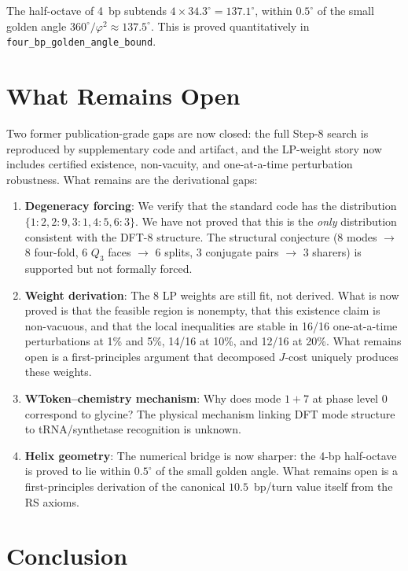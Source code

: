 \documentclass[11pt,twocolumn]{article}
\newcommand{\vp}{\varphi}
\newcommand{\lean}[1]{\texttt{#1}}
\begin{document}
The half-octave of 4~bp subtends $4 \times 34.3^\circ = 137.1^\circ$, within
$0.5^\circ$ of the small golden angle $360^\circ/\vp^2 \approx 137.5^\circ$. This is
proved quantitatively in \lean{four\_bp\_golden\_angle\_bound}.

\section{What Remains Open}

Two former publication-grade gaps are now closed: the full Step-8 search is
reproduced by supplementary code and artifact, and the LP-weight story now
includes certified existence, non-vacuity, and one-at-a-time perturbation
robustness. What remains are the derivational gaps:

\begin{enumerate}
\item \textbf{Degeneracy forcing}: We verify that the standard code has
  the distribution $\{1{:}2, 2{:}9, 3{:}1, 4{:}5, 6{:}3\}$. We have
  not proved that this is the \emph{only} distribution consistent with
  the DFT-8 structure. The structural conjecture (8 modes $\to$ 8
  four-fold, 6 $Q_3$ faces $\to$ 6 splits, 3 conjugate pairs $\to$ 3
  sharers) is supported but not formally forced.

\item \textbf{Weight derivation}: The 8 LP weights are still fit, not
  derived. What is now proved is that the feasible region is nonempty,
  that this existence claim is non-vacuous, and that the local
  inequalities are stable in 16/16 one-at-a-time perturbations at 1\%
  and 5\%, 14/16 at 10\%, and 12/16 at 20\%. What remains open is a
  first-principles argument that
  decomposed $J$-cost uniquely produces these weights.

\item \textbf{WToken--chemistry mechanism}: Why does mode $1{+}7$ at
  phase level 0 correspond to glycine? The physical mechanism linking
  DFT mode structure to tRNA/synthetase recognition is unknown.

\item \textbf{Helix geometry}: The numerical bridge is now sharper: the
  4-bp half-octave is proved to lie within $0.5^\circ$ of the small golden
  angle. What remains open is a first-principles derivation of the
  canonical $10.5$~bp/turn value itself from the RS axioms.
\end{enumerate}

\section{Conclusion}
\end{document}

